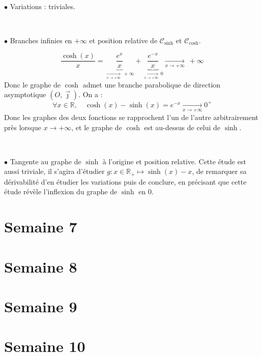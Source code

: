 \documentclass{article}
\begin{document}
\

$\bullet$ Variations : triviales.

\

$\bullet$ Branches infinies en $+\infty$ et position relative de $\mathcal{C}_{\sinh}$ et $\mathcal{C}_{\cosh}$.

\[
\frac{\cosh(x)}{x} = \underset{\xrightarrow[x\to +\infty]{} \ +\infty}{\underbrace{\frac{e^{x}}{x}}} + \underset{\xrightarrow[x\to +\infty]{} \ 0}{\underbrace{\frac{e^{-x}}{x}}} \xrightarrow[x\to +\infty]{} \ +\infty
\]
Donc le graphe de $\cosh$ admet une branche parabolique de direction asymptotique $\left( O, \overrightarrow{\jmath}\right)$.
\newline
On a : 
\[
\forall x \in \mathbb{R}, \quad \cosh(x) - \sinh(x) = e^{-x} \xrightarrow[x\to +\infty]{} 0^+
\]
Donc les graphes des deux fonctions se rapprochent l'un de l'autre arbitrairement près lorsque $x \to +\infty$, et le graphe de $\cosh$ est au-dessus de celui de $\sinh$.

\

$\bullet$ Tangente au graphe de $\sinh$ à l'origine et position relative.
\newline
Cette étude est aussi triviale, il s'agira d'étudier $g : x\in \mathbb{R}_+ \mapsto \sinh(x) -x$, de remarquer sa dérivabilité d'en étudier les variations puis de conclure, en précisant que cette étude révèle l'inflexion du graphe de $\sinh$ en 0.

\section{Semaine 7} 
\label{sec:S7}


\section{Semaine 8} 
\label{sec:S8}


\section{Semaine 9} 
\label{sec:S9}


\section{Semaine 10} 
\label{sec:S10}
\end{document}
